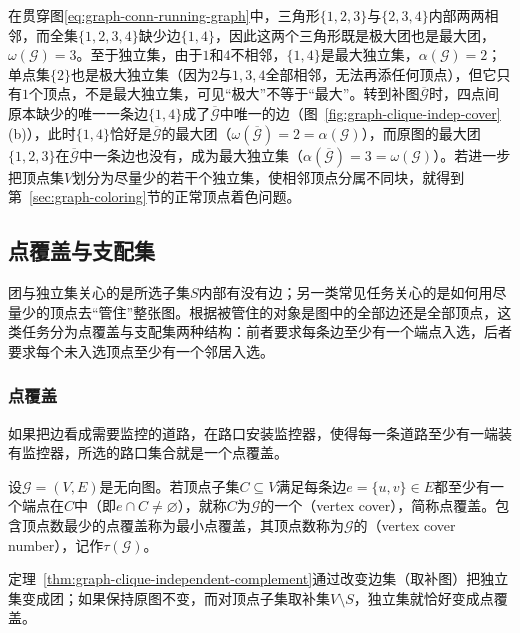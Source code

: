 在贯穿图\eqref{eq:graph-conn-running-graph}中，三角形$\{1,2,3\}$与$\{2,3,4\}$内部两两相邻，而全集$\{1,2,3,4\}$缺少边$\{1,4\}$，因此这两个三角形既是极大团也是最大团，$\omega(\mathcal G)=3$。至于独立集，由于$1$和$4$不相邻，$\{1,4\}$是最大独立集，$\alpha(\mathcal G)=2$；单点集$\{2\}$也是极大独立集（因为$2$与$1,3,4$全部相邻，无法再添任何顶点），但它只有$1$个顶点，不是最大独立集，可见“极大”不等于“最大”。转到补图$\overline{\mathcal G}$时，四点间原本缺少的唯一一条边$\{1,4\}$成了$\overline{\mathcal G}$中唯一的边（图~\ref{fig:graph-clique-indep-cover}(b)），此时$\{1,4\}$恰好是$\overline{\mathcal G}$的最大团（$\omega(\overline{\mathcal G})=2=\alpha(\mathcal G)$），而原图的最大团$\{1,2,3\}$在$\overline{\mathcal G}$中一条边也没有，成为最大独立集（$\alpha(\overline{\mathcal G})=3=\omega(\mathcal G)$）。若进一步把顶点集$V$划分为尽量少的若干个独立集，使相邻顶点分属不同块，就得到第~\ref{sec:graph-coloring}节的正常顶点着色问题。

\subsection{点覆盖与支配集}
\label{sec:graph-vertex-cover-dominating}

团与独立集关心的是所选子集$S$内部有没有边；另一类常见任务关心的是如何用尽量少的顶点去“管住”整张图。根据被管住的对象是图中的全部边还是全部顶点，这类任务分为点覆盖与支配集两种结构：前者要求每条边至少有一个端点入选，后者要求每个未入选顶点至少有一个邻居入选。

\subsubsection{点覆盖}
\label{sec:graph-vertex-cover}

如果把边看成需要监控的道路，在路口安装监控器，使得每一条道路至少有一端装有监控器，所选的路口集合就是一个点覆盖。

\begin{definition}[点覆盖]
\label{def:graph-vertex-cover}
设$\mathcal G=(V,E)$是无向图。若顶点子集$C\subseteq V$满足每条边$e=\{u,v\}\in E$都至少有一个端点在$C$中（即$e\cap C\neq\varnothing$），就称$C$为$\mathcal G$的一个（vertex cover），简称点覆盖。包含顶点数最少的点覆盖称为最小点覆盖，其顶点数称为$\mathcal G$的（vertex cover number），记作$\tau(\mathcal G)$。
\end{definition}

定理~\ref{thm:graph-clique-independent-complement}通过改变边集（取补图）把独立集变成团；如果保持原图不变，而对顶点子集取补集$V\setminus S$，独立集就恰好变成点覆盖。

